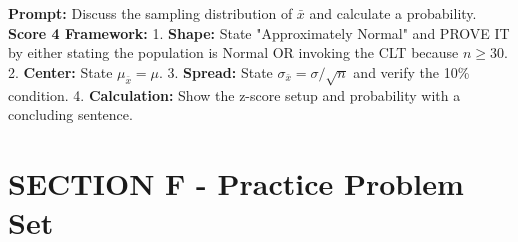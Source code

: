 \begin{frqrubricbox}
\textbf{Prompt:} Discuss the sampling distribution of $\bar{x}$ and calculate a probability.
\textbf{Score 4 Framework:}
1. \textbf{Shape:} State "Approximately Normal" and PROVE IT by either stating the population is Normal OR invoking the CLT because $n \geq 30$.
2. \textbf{Center:} State $\mu_{\bar{x}} = \mu$.
3. \textbf{Spread:} State $\sigma_{\bar{x}} = \sigma/\sqrt{n}$ and verify the 10\% condition.
4. \textbf{Calculation:} Show the z-score setup and probability with a concluding sentence.
\end{frqrubricbox}

\section{SECTION F - Practice Problem Set}
